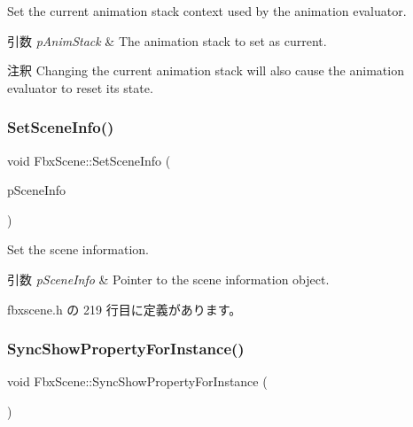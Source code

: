 Set the current animation stack context used by the animation evaluator. 
\begin{DoxyParams}{引数}
{\em p\+Anim\+Stack} & The animation stack to set as current. \\
\hline
\end{DoxyParams}
\begin{DoxyRemark}{注釈}
Changing the current animation stack will also cause the animation evaluator to reset its state. 
\end{DoxyRemark}
\mbox{\label{class_fbx_scene_a486c147dc25d9bec4938852d2550cb81}} 
\subsubsection{\texorpdfstring{Set\+Scene\+Info()}{SetSceneInfo()}}
{\footnotesize\ttfamily void Fbx\+Scene\+::\+Set\+Scene\+Info (\begin{DoxyParamCaption}\item[{\hyperlink{class_fbx_document_info}{Fbx\+Document\+Info} $\ast$}]{p\+Scene\+Info }\end{DoxyParamCaption})\hspace{0.3cm}{\ttfamily [inline]}}

Set the scene information. 
\begin{DoxyParams}{引数}
{\em p\+Scene\+Info} & Pointer to the scene information object. \\
\hline
\end{DoxyParams}


 fbxscene.\+h の 219 行目に定義があります。

\mbox{\label{class_fbx_scene_a940444136913f6e50f687ff0807c93e5}} 
\subsubsection{\texorpdfstring{Sync\+Show\+Property\+For\+Instance()}{SyncShowPropertyForInstance()}}
{\footnotesize\ttfamily void Fbx\+Scene\+::\+Sync\+Show\+Property\+For\+Instance (\begin{DoxyParamCaption}{ }\end{DoxyParamCaption})}

